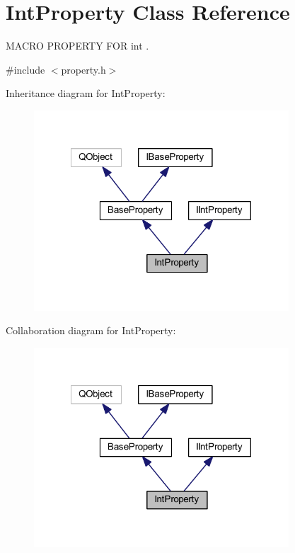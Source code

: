 \hypertarget{class_int_property}{\section{Int\-Property Class Reference}
\label{class_int_property}
}


M\-A\-C\-R\-O P\-R\-O\-P\-E\-R\-T\-Y F\-O\-R int .  




{\ttfamily \#include $<$property.\-h$>$}



Inheritance diagram for Int\-Property\-:
\nopagebreak
\begin{figure}[H]
\begin{center}
\leavevmode
\includegraphics[width=270pt]{class_int_property__inherit__graph}
\end{center}
\end{figure}


Collaboration diagram for Int\-Property\-:
\nopagebreak
\begin{figure}[H]
\begin{center}
\leavevmode
\includegraphics[width=270pt]{class_int_property__coll__graph}
\end{center}
\end{figure}
